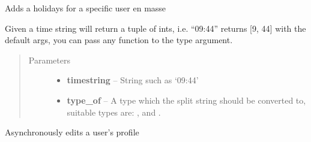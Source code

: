 \documentclass[letterpaper,10pt,english]{sphinxmanual}
\begin{document}

\begin{fulllineitems}
\label{code:timetracker.utils.calendar_utils.mass_holidays}
Adds a holidays for a specific user en masse

\end{fulllineitems}


\begin{fulllineitems}
\label{code:timetracker.utils.calendar_utils.parse_time}
Given a time string will return a tuple of ints,
i.e. ``09:44'' returns {[}9, 44{]} with the default args,
you can pass any function to the type argument.
\begin{quote}\begin{description}
\item[{Parameters}] \leavevmode\begin{itemize}
\item {} 
\textbf{timestring} -- String such as `09:44'

\item {} 
\textbf{type\_of} -- A type which the split string should be converted to,
suitable types are: ,  and
.

\end{itemize}

\end{description}\end{quote}

\end{fulllineitems}


\begin{fulllineitems}
\label{code:timetracker.utils.calendar_utils.profile_edit}
Asynchronously edits a user's profile

\end{fulllineitems}

\end{document}

